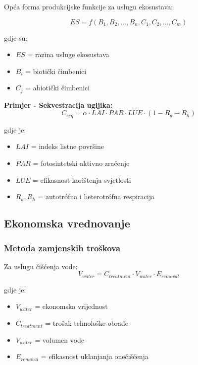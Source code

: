 \documentclass[11pt,oneside]{book}
\begin{document}
Opća forma produkcijske funkcije za uslugu ekosustava:

\begin{equation}
	ES = f(B_1, B_2, ..., B_n, C_1, C_2, ..., C_m)
\end{equation}

gdje su:
\begin{itemize}
	\item $ES$ = razina usluge ekosustava
	\item $B_i$ = biotički čimbenici
	\item $C_j$ = abiotički čimbenici
\end{itemize}

\textbf{Primjer - Sekvestracija ugljika:}
\begin{equation}
	C_{seq} = \alpha \cdot LAI \cdot PAR \cdot LUE \cdot (1 - R_a - R_h)
\end{equation}

gdje je:
\begin{itemize}
	\item $LAI$ = indeks listne površine
	\item $PAR$ = fotosintetski aktivno zračenje
	\item $LUE$ = efikasnost korištenja svjetlosti
	\item $R_a, R_h$ = autotrófna i heterotrófna respiracija
\end{itemize}

\subsection{Ekonomska vrednovanje}

\subsubsection{Metoda zamjenskih troškova}

Za uslugu čišćenja vode:
\begin{equation}
	V_{water} = C_{treatment} \cdot V_{water} \cdot E_{removal}
\end{equation}

gdje je:
\begin{itemize}
	\item $V_{water}$ = ekonomska vrijednost
	\item $C_{treatment}$ = trošak tehnološke obrade
	\item $V_{water}$ = volumen vode
	\item $E_{removal}$ = efikasnost uklanjanja onečišćenja
\end{itemize}
\end{document}
